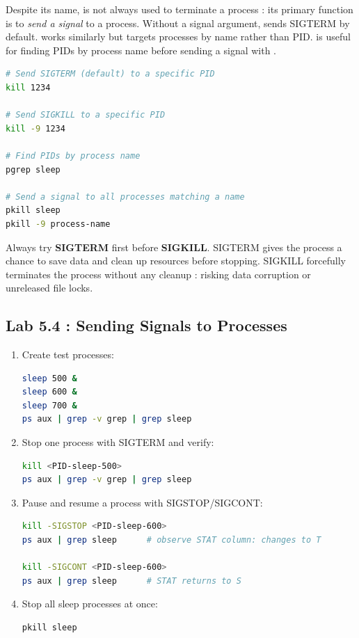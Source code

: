 Despite its name,  is not always used to terminate a process : its
primary function is to \textit{send a signal} to a process. Without a signal
argument,  sends SIGTERM by default.  works similarly but
targets processes by name rather than PID.  is useful for finding
PIDs by process name before sending a signal with .

\begin{lstlisting}[language=bash, caption={Using kill, pkill, and pgrep}]
# Send SIGTERM (default) to a specific PID
kill 1234

# Send SIGKILL to a specific PID
kill -9 1234

# Find PIDs by process name
pgrep sleep

# Send a signal to all processes matching a name
pkill sleep
pkill -9 process-name
\end{lstlisting}

\begin{tipbox}
  Always try \textbf{SIGTERM} first before \textbf{SIGKILL}. SIGTERM gives the
  process a chance to save data and clean up resources before stopping.
  SIGKILL forcefully terminates the process without any cleanup : risking data
  corruption or unreleased file locks.
\end{tipbox}

\subsection*{Lab 5.4 : Sending Signals to Processes}

\begin{enumerate}
  \item Create test processes:
\begin{lstlisting}[language=bash, caption={Creating test processes}]
sleep 500 &
sleep 600 &
sleep 700 &
ps aux | grep -v grep | grep sleep
\end{lstlisting}

  \item Stop one process with SIGTERM and verify:
\begin{lstlisting}[language=bash, caption={Stopping a process with SIGTERM}]
kill <PID-sleep-500>
ps aux | grep -v grep | grep sleep
\end{lstlisting}

  \item Pause and resume a process with SIGSTOP/SIGCONT:
\begin{lstlisting}[language=bash, caption={Pausing and resuming a process}]
kill -SIGSTOP <PID-sleep-600>
ps aux | grep sleep      # observe STAT column: changes to T

kill -SIGCONT <PID-sleep-600>
ps aux | grep sleep      # STAT returns to S
\end{lstlisting}

  \item Stop all sleep processes at once:
\begin{lstlisting}[language=bash, caption={Stopping all sleep processes}]
pkill sleep
\end{lstlisting}
\end{enumerate}

